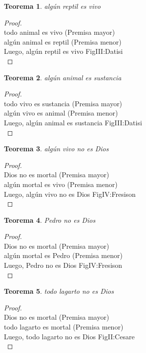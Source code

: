 ﻿\documentclass[12pt]{book}
\newtheorem{theorem}{Teorema}[chapter]
\newtheorem{proof}{Demostración}
\begin{document}
\begin{theorem}
algún reptil es vivo
\label{th: 102}
\end{theorem}\begin{proof}\\todo animal es vivo	 (Premisa mayor) \\algún animal es reptil	 (Premisa menor) \\Luego, algún reptil es vivo	FigIII:Datisi \\ \end{proof}
\begin{theorem}
algún animal es sustancia
\label{th: 103}
\end{theorem}\begin{proof}\\todo vivo es sustancia	 (Premisa mayor) \\algún vivo es animal	 (Premisa menor) \\Luego, algún animal es sustancia	FigIII:Datisi \\ \end{proof}
\begin{theorem}
algún vivo no es Dios
\label{th: 104}
\end{theorem}\begin{proof}\\Dios no es mortal	 (Premisa mayor) \\algún mortal es vivo	 (Premisa menor) \\Luego, algún vivo no es Dios	FigIV:Fresison \\ \end{proof}
\begin{theorem}
Pedro no es Dios
\label{th: 105}
\end{theorem}\begin{proof}\\Dios no es mortal	 (Premisa mayor) \\algún mortal es Pedro	 (Premisa menor) \\Luego, Pedro no es Dios	FigIV:Fresison \\ \end{proof}
\begin{theorem}
todo lagarto no es Dios
\label{th: 106}
\end{theorem}\begin{proof}\\Dios no es mortal	 (Premisa mayor) \\todo lagarto es mortal	 (Premisa menor) \\Luego, todo lagarto no es Dios	FigII:Cesare \\ \end{proof}
\end{document}
